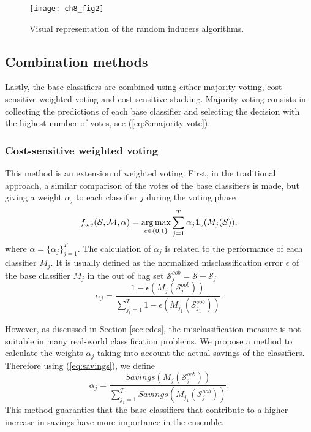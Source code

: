 {\begin{figure}[t!]
\texttt{[image: ch8\_fig2]}
\caption{Visual representation of the random inducers algorithms.}
\label{fig:8:2}
\end{figure} 


\subsection{Combination methods}
  Lastly, the base classifiers are combined using either majority voting, cost-sensitive weighted 
  voting and cost-sensitive stacking. Majority voting consists in collecting the predictions of 
  each base classifier and selecting the decision with the highest number of votes, see 
  (\ref{eq:8:majority-vote}).

  \subsubsection*{Cost-sensitive weighted voting}

  This method is an extension of weighted voting. First, in the traditional approach, a 
  similar comparison of the votes of the base classifiers is made, but giving a weight $\alpha_j$ 
  to each classifier $j$ during the voting phase \citep{Zhou2012}
  \begin{align} \label{eq:8:weighted-majority-vote}
    f_{wv}(\mathcal{S},\mathcal{M}, \alpha)
    =\operatorname*{arg\,max}_{c \in \{0,1\}} \sum_{j=1}^T \alpha_j \mathbf{1}_c(M_j(\mathcal{S})),
  \end{align}
  where $\alpha=\{\alpha_j\}_{j=1}^T$.
  The calculation of $\alpha_j$ is related to the performance of each classifier $M_j$.
  It is usually defined as the normalized misclassification error   $\epsilon$ of the base 
  classifier $M_j$  in the out of bag set   $\mathcal{S}_j^{oob}=\mathcal{S}-\mathcal{S}_j$
  \begin{equation}
    \alpha_j=\frac{1-\epsilon(M_j(\mathcal{S}_j^{oob}))}{\sum_{j_1=1}^T 
    1-\epsilon(M_{j_1}(\mathcal{S}_{j_1}^{oob}))}.
  \end{equation}

  However, as discussed in Section \ref{sec:edcs}, the misclassification measure is not suitable in 
  many real-world classification problems. We propose a method to calculate the weights $\alpha_j$ 
  taking into account the actual savings of the classifiers. Therefore using (\ref{eq:savings}), we 
  define
  \begin{equation}
    \alpha_j=\frac{Savings(M_j(\mathcal{S}_j^{oob}))}
    {\sum_{j_1=1}^T Savings(M_{j_1}(\mathcal{S}_j^{oob}))}.
  \end{equation}
  This method guaranties that the base classifiers that contribute to a higher increase in savings 
  have more importance in the ensemble.
  
}
